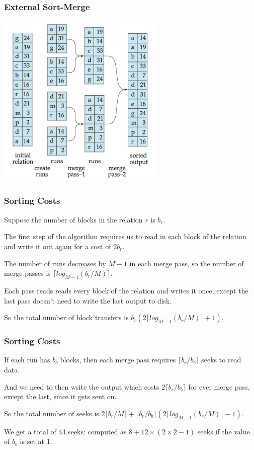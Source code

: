 \begin{frame}
\frametitle{External Sort-Merge}

\begin{center}
	\includegraphics[width=0.6\textwidth]{images/external-merge}
\end{center}

\end{frame}

\begin{frame}
\frametitle{Sorting Costs}

Suppose the number of blocks in the relation $r$ is $b_{r}$.


The first step of the algorithm requires us to read in each block of the relation and write it out again for a cost of $2b_{r}$. 

The number of runs decreases by $M-1$ in each merge pass, so the number of merge passes is $\lceil log_{M-1}(b_{r}/M)\rceil$. 

Each pass reads reads every block of the relation and writes it once, except the last pass doesn't need to write the last output to disk. 

So the total number of block transfers is $b_{r}(2\lceil log_{M-1}(b_{r}/M)\rceil + 1)$. 

\end{frame}

\begin{frame}
\frametitle{Sorting Costs}

If each run has $b_{b}$ blocks, then each merge pass requires $\lceil b_{r}/b_{b}\rceil$ seeks to read data. 

And we need to then write the output which costs  $2\lceil b_{r}/b_{b}\rceil$ for ever merge pass, except the last, since it gets sent on. 

So the total number of seeks is $2\lceil b_{r}/M\rceil + \lceil b_{r}/b_{b}\rceil(2 \lceil log_{M-1}(b_{r}/M)\rceil - 1)$.


We get a total of 44 seeks: computed as $8 + 12 \times (2 \times 2 - 1)$ seeks if the value of $b_{b}$ is set at 1.

\end{frame}

